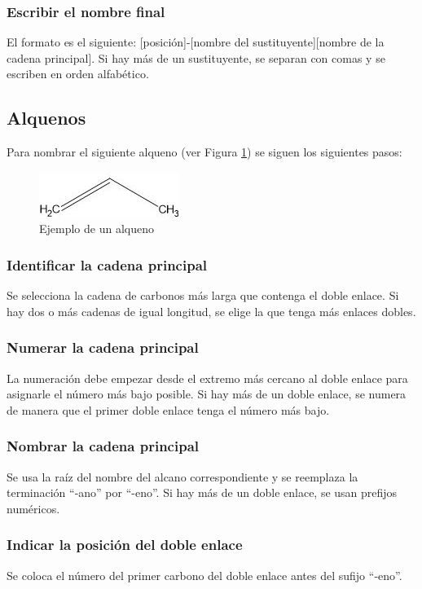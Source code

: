 \documentclass{article}
\begin{document}
\subsubsection{Escribir el nombre final}
El formato es el siguiente: [posición]-[nombre del sustituyente][nombre de la cadena principal]. Si hay más de un sustituyente, se separan con comas y se escriben en orden alfabético.

\subsection{Alquenos}
Para nombrar el siguiente alqueno (ver Figura \ref{fig:alqueno}) se siguen los siguientes pasos:
\begin{figure}[h]
    \centering
    \includegraphics[width=0.5\linewidth]{media/propeno.jpg}
    \caption{Ejemplo de un alqueno}
    \label{fig:alqueno}
\end{figure}

\subsubsection{Identificar la cadena principal}
Se selecciona la cadena de carbonos más larga que contenga el doble enlace. Si hay dos o más cadenas de igual longitud, se elige la que tenga más enlaces dobles.

\subsubsection{Numerar la cadena principal}
La numeración debe empezar desde el extremo más cercano al doble enlace para asignarle el número más bajo posible. Si hay más de un doble enlace, se numera de manera que el primer doble enlace tenga el número más bajo.

\subsubsection{Nombrar la cadena principal}
Se usa la raíz del nombre del alcano correspondiente y se reemplaza la terminación ``-ano'' por ``-eno''. Si hay más de un doble enlace, se usan prefijos numéricos.

\subsubsection{Indicar la posición del doble enlace}
Se coloca el número del primer carbono del doble enlace antes del sufijo ``-eno''.
\end{document}
